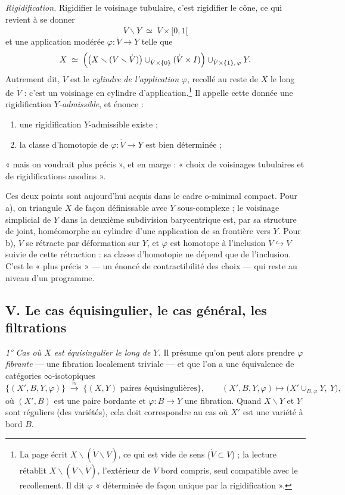 \documentclass[11pt,a4paper]{article}
\begin{document}
\emph{Rigidification.} Rigidifier le voisinage tubulaire, c'est rigidifier le
cône, ce qui revient à se donner
\[
  V \smallsetminus Y \;\simeq\; \dot V \times [0, 1[
\]
et une application modérée $\varphi \colon \dot V \to Y$ telle que
\[
  X \;\simeq\; \Bigl( \bigl(X \smallsetminus (V \smallsetminus \dot V)\bigr)
  \cup_{\dot V \times \{0\}} (\dot V \times I) \Bigr)
  \cup_{\dot V \times \{1\},\, \varphi} Y .
\]
Autrement dit, $V$ est le \emph{cylindre de l'application} $\varphi$, recollé
au reste de $X$ le long de $\dot V$ : c'est un voisinage en cylindre
d'application.\footnote{La page écrit $X \smallsetminus (\dot V \smallsetminus
V)$, ce qui est vide de sens ($\dot V \subset V$) ; la lecture rétablit
$X \smallsetminus (V \smallsetminus \dot V)$, l'extérieur de $V$ bord compris,
seul compatible avec le recollement. Il dit $\varphi$ « déterminée de façon
unique par la rigidification ».} Il appelle cette donnée une rigidification
\emph{$Y$-admissible}, et énonce :
\begin{enumerate}
\item[a)] une rigidification $Y$-admissible existe ;
\item[b)] la classe d'homotopie de $\varphi \colon \dot V \to Y$ est bien
  déterminée ;
\end{enumerate}
« mais on voudrait plus précis », et en marge : « choix de voisinages
tubulaires et de rigidifications anodins ».

Ces deux points sont aujourd'hui acquis dans le cadre o-minimal compact. Pour
a), on triangule $X$ de façon définissable avec $Y$ sous-complexe ; le voisinage simplicial de $Y$ dans la deuxième subdivision barycentrique est,
par sa structure de joint, homéomorphe au cylindre d'une application de sa
frontière vers $Y$. Pour b),
$V$ se rétracte par déformation sur $Y$, et $\varphi$ est homotope à
l'inclusion $\dot V \hookrightarrow V$ suivie de cette rétraction : sa classe
d'homotopie ne dépend que de l'inclusion. C'est le « plus précis » — un
énoncé de contractibilité des choix — qui reste au niveau d'un programme.

\subsection*{V. Le cas équisingulier, le cas général, les filtrations}

\emph{1° Cas où $X$ est équisingulier le long de $Y$.} Il présume qu'on peut
alors prendre $\varphi$ \emph{fibrante} — une fibration localement triviale
— et que l'on a une équivalence de catégories $\infty$-isotopiques
\[
  \bigl\{ (X', B, Y, \varphi) \bigr\}
  \;\xrightarrow{\ \approx\ }\;
  \bigl\{ (X, Y) \text{ paires équisingulières} \bigr\},
  \qquad
  (X', B, Y, \varphi) \longmapsto \bigl( X' \cup_{B, \varphi} Y,\ Y \bigr),
\]
où $(X', B)$ est une paire bordante et $\varphi \colon B \to Y$ une
fibration. Quand $X \smallsetminus Y$ et $Y$ sont réguliers (des variétés),
cela doit correspondre au cas où $X'$ est une variété à bord $B$.
\end{document}
